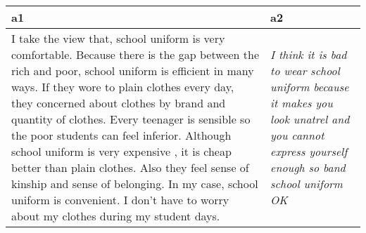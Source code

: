 \centering
\caption{
              A pair of arguments from \textbf{UKP}, 
              for the prompt topic: ``school uniforms are a good idea''. 
              }
\begin{tabular}{p{6cm}|p{6cm}}
\toprule
                                                                                                                                                                                                                                                                                                                                                                                                                                                                                                                                                                                     a1 &                                                                                                                                           a2 \\
\midrule
 I take the view that, school uniform is very comfortable. Because there is the 
 gap between the rich and poor, school uniform is efficient in many ways. If 
 they wore to plain clothes every day, they concerned about clothes by brand 
 and quantity of clothes. Every teenager is sensible so the poor students can 
 feel inferior. Although school uniform is very expensive , it is cheap better 
 than plain clothes. Also they feel sense of kinship and sense of belonging. In 
 my case, school uniform is convenient. I don't have to worry about my clothes 
 during my student days. &  \textit{I think it is bad to wear school uniform 
 because it makes you look unatrel and you cannot express yourself enough so 
 band school uniform OK} \\
\bottomrule
\end{tabular}
